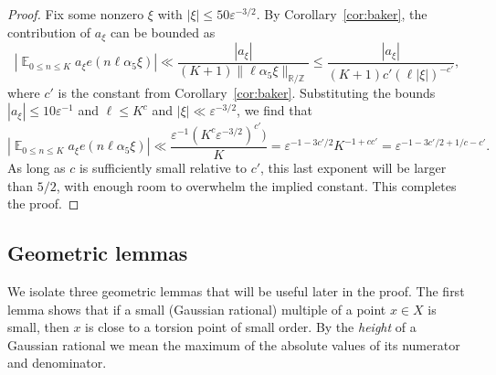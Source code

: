 \documentclass[11pt]{amsart}
\theoremstyle{definition}
\DeclareMathOperator*{\E}{\mathbb{E}}
\begin{document}
\begin{proof}
Fix some nonzero $\xi$ with $|\xi| \leq 50\varepsilon^{-3/2}$.  By Corollary~\ref{cor:baker}, the contribution of $a_\xi$ can be bounded as
$$\left|\E_{0 \leq n \leq K} a_\xi e(n\ell \alpha_5 \xi)\right| \ll \frac{|a_\xi|}{(K+1)\|\ell \alpha_5 \xi\|_{\mathbb{R}/\mathbb{Z}}} \leq \frac{|a_\xi|}{(K+1) c'(\ell |\xi|)^{-c'}},$$
where $c'$ is the constant from Corollary~\ref{cor:baker}.  Substituting the bounds $|a_\xi| \leq 10 \varepsilon^{-1}$ and $\ell \leq K^c$ and $|\xi| \ll \varepsilon^{-3/2}$, we find that
$$\left|\E_{0 \leq n \leq K} a_\xi e(n\ell \alpha_5 \xi)\right| \ll \frac{\varepsilon^{-1}(K^c \varepsilon^{-3/2})^{c'})}{K}=\varepsilon^{-1-3c'/2}K^{-1+cc'}=\varepsilon^{-1-3c'/2+1/c-c'}.$$
As long as $c$ is sufficiently small relative to $c'$, this last exponent will be larger than $5/2$, with enough room to overwhelm the implied constant.  This completes the proof.
\end{proof}


\subsection{Geometric lemmas}

We isolate three geometric lemmas that will be useful later in the proof.  The first lemma shows that if a small (Gaussian rational) multiple of a point $x \in X$ is small, then $x$ is close to a torsion point of small order.  By the \emph{height} of a Gaussian rational we mean the maximum of the absolute values of its numerator and denominator.
\end{document}
